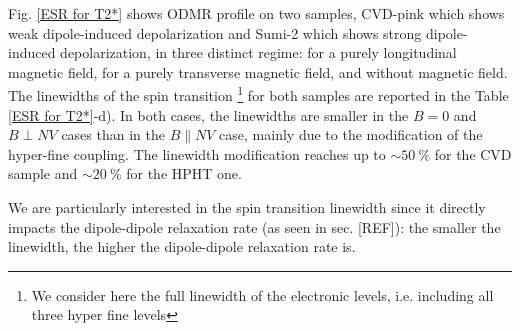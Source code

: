 \documentclass[a4paper, 11pt]{book}
\begin{document}
Fig. \ref{ESR for T2*} shows ODMR profile on two samples, CVD-pink which shows weak dipole-induced depolarization and Sumi-2 which shows strong dipole-induced depolarization, in three distinct regime: for a purely longitudinal magnetic field, for a purely transverse magnetic field, and without magnetic field. The linewidths of the spin transition \footnote{We consider here the full linewidth of the electronic levels, i.e. including all three hyper fine levels} for both samples are reported in the Table \ref{ESR for T2*}-d). In both cases, the linewidths are smaller in the $B=0$ and $B \perp NV$ cases than in the $B \parallel NV$ case, mainly due to the modification of the hyper-fine coupling. The linewidth modification reaches up to $\sim 50\ \%$ for the CVD sample and $\sim 20\ \%$ for the HPHT one.

We are particularly interested in the spin transition linewidth since it directly impacts the dipole-dipole relaxation rate (as seen in sec. [REF]): the smaller the linewidth, the higher the dipole-dipole relaxation rate is.
\end{document}
